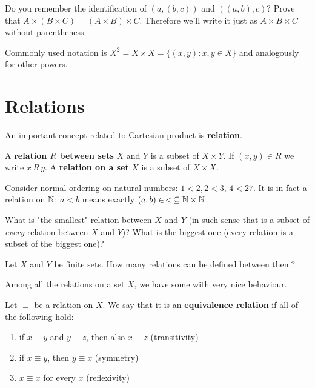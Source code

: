 \begin{prob}
	Do you remember the identification of $(a,(b,c))$ and $((a,b),c)$? Prove that
	$A\times (B\times C) = (A\times B)\times C$. Therefore we'll write it just as $A\times B\times C$
	without parentheness.
\end{prob}

\noindent Commonly used notation is $X^2 = X\times X = \{(x,y) : x, y \in X\}$ and analogously for other powers.

\section{Relations}
An important concept related to Cartesian product is \textbf{relation}.

\begin{definition}
  A \textbf{relation $R$ between sets} $X$ and $Y$ is a subset of $X\times Y$. If $(x,y)\in R$ we write $x\,R\,y$. A \textbf{relation on a set} $X$ is a subset of $X\times X$.
\end{definition}

\begin{example}
  Consider normal ordering on natural numbers: $1<2$,\,$2<3,\, 4<27$. It is in fact a relation on $\mathbb N$: $a<b$ means exactly $(a,b)\in\, <\,\subseteq \mathbb N\times \mathbb N$.
\end{example}

\begin{exercise}
  What is "the smallest" relation between $X$ and $Y$ (in such sense that is a subset of \emph{every} relation between $X$ and $Y$)? What is the biggest one (every relation is a subset of the biggest one)?
\end{exercise}

\begin{exercise}
  Let $X$ and $Y$ be finite sets. How many relations can be defined between them?
\end{exercise}

Among all the relations on a set $X$, we have some with very nice behaviour.

\begin{definition}
  Let $\equiv$ be a relation on $X$. We say that it is an \textbf{equivalence relation} if all of the following hold:
  \begin{enumerate}
    \item if $x\equiv y$ and $y\equiv z$, then also $x\equiv z$ (transitivity)
    \item if $x\equiv y$, then $y\equiv x$ (symmetry)
    \item $x\equiv x$ for every $x$ (reflexivity)
  \end{enumerate}
\end{definition}

